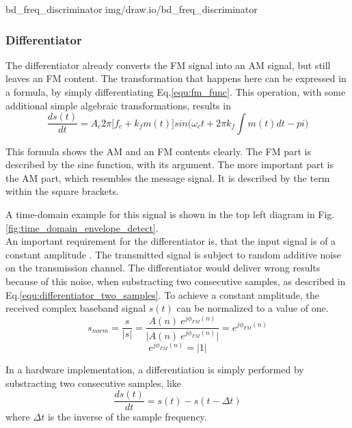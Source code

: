  {bd_freq_discriminator} {img/draw.io/bd_freq_discriminator}

\subsubsection{Differentiator}

The differentiator already converts the FM signal into an AM signal, but still leaves an FM content.
The transformation that happens here can be expressed in a formula, by simply differentiating Eq.\eqref{equ:fm_func}.
This operation, with some additional simple algebraic transformations, results in
\begin{equation}
  \frac{d s(t)}{dt} = A_c 2 \pi \Big[f_c + k_f m(t) \Big] sin \Big(\omega_c t + 2 \pi k_f \int m(t) dt -pi \Big)
  \label{equ:fm_demod_discriminator}
\end{equation}

This formula shows the AM and an FM contents clearly.
The FM part is described by the sine function, with its argument.
The more important part is the AM part, which resembles the message signal.
It is described by the term within the square brackets.

A time-domain example for this signal is shown in the top left diagram in Fig.\ref{fig:time_domain_envelope_detect}.\\

An important requirement for the differentiator is, that the input signal is of a constant amplitude \cite{SchnyderHaller2002}.
The transmitted signal is subject to random additive noise on the transmission channel.
The differentiator would deliver wrong results because of this noise, when substracting two consecutive samples, as described in Eq.\eqref{equ:differentiator_two_samples}.
To achieve a constant amplitude, the received complex baseband signal $s(t)$ can be normalized to a value of one.
\begin{equation}
  s_{norm} = \frac{s}{|s|} = \frac{A(n)\ e^{j\phi_{FM}(n)}}{|{A(n)\ e^{j\phi_{FM}(n)}|}} = e^{j\phi_{FM}(n)}
\end{equation}
\begin{equation}
  e^{j\phi_{FM}(n)} = |1|
\end{equation}

In a hardware implementation, a differentiation is simply performed by substracting two consecutive samples, like
\begin{equation}
  \frac{d s(t)}{dt} = s(t) - s(t-\Delta t)
  \label{equ:differentiator_two_samples}
\end{equation}
where $\Delta t$ is the inverse of the sample frequency.\\ %

